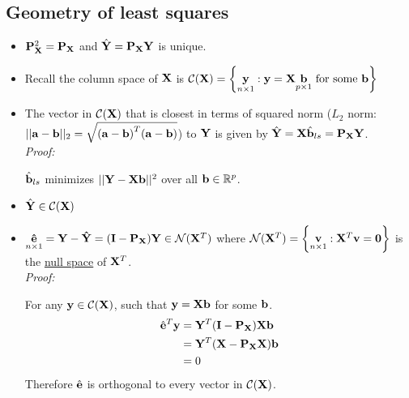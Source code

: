 \subsection*{Geometry of least squares}
\begin{itemize}
	\item 	$\mathbf{P}_{\mathbf{X}}^2 = \mathbf{P_X}$ and $\hat{\mathbf{Y}} = \mathbf{P}_{\mathbf{X}} \mathbf{Y}$ is unique.
	\item Recall the column space of $\mathbf{X}$ is $\mathcal{C}(\mathbf{X}) = \left\{ \underset{n \times 1}{\mathbf{y}} : \mathbf{y} = \mathbf{X}\underset{p \times 1}{\mathbf{b}} \mbox{ for some } \mathbf{b} \right\}$
	\item The vector in $\mathcal{C}(\mathbf{X})$ that is closest in terms of squared norm ($L_2$ norm: $||\mathbf{a - b}||_2 = \sqrt{\mathbf{(a - b)}^T \mathbf{(a - b)}}$) to $\mathbf{Y}$ is given by $\hat{\mathbf{Y}} = \mathbf{X}\hat{\mathbf{b}}_{ls} = \mathbf{P}_{\mathbf{X}}\mathbf{Y}$.\\
	{\it Proof:}
	\begin{pf}
		$\hat{\mathbf{b}}_{ls}$ minimizes $||\mathbf{Y-Xb}||^2$ over all $\mathbf{b} \in \mathbb{R}^p$.
	\end{pf}
	\item $\hat{\mathbf{Y}} \in \mathcal{C}(\mathbf{X})$
	\item  $\underset{n \times 1}{\mathbf{\hat{e}}} = \mathbf{Y - \hat{Y}} = (\mathbf{I} - \mathbf{P}_{\mathbf{X}})\mathbf{Y} \in \mathcal{N}(\mathbf{X}^T)$ 
	where $\mathcal{N}(\mathbf{X}^T) = \left\{\underset{n \times 1}{\mathbf{v}}: \mathbf{X}^T \mathbf{v} = \mathbf{0}\right\}$ is the \underline{null space} of $\mathbf{X}^T$.\\
	{\it Proof:}
	\begin{pf}
		For any $\mathbf{y} \in \mathcal{C}(\mathbf{X})$, such that $\mathbf{y = Xb}$ for some $\mathbf{b}$.
		$$
		\begin{aligned}
			\hat{\mathbf{e}}^T \mathbf{y} &= \mathbf{Y}^T (\mathbf{I} - \mathbf{P}_{\mathbf{X}}) \mathbf{Xb}\\
			&= \mathbf{Y}^T (\mathbf{X} - \mathbf{P}_{\mathbf{X}} \mathbf{X}) \mathbf{b}\\
			&= 0\\
		\end{aligned}
		$$
		Therefore $\hat{\mathbf{e}}$ is orthogonal to every vector in $\mathcal{C}(\mathbf{X})$.
	\end{pf}
\end{itemize}

